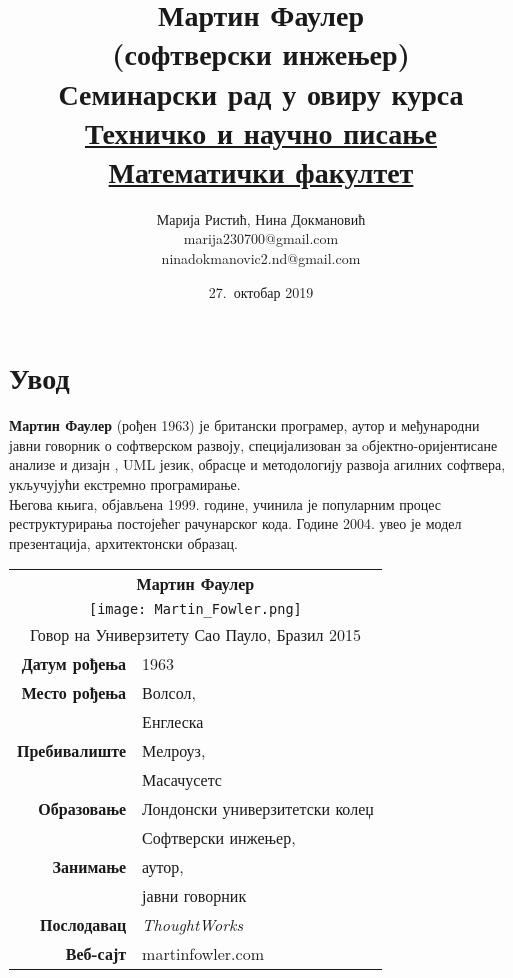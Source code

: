 \documentclass[12pt,a4paper]{article}
\begin{document}
\title{\textbf{Мартин Фаулер \\(софтверски инжењер)}\\ \small{Семинарски рад у овиру курса\\ \href{http://www.itkomunikacija.matf.bg.ac.rs/TehnickoINaucnoPisanje.html}{Техничко и научно писање}\\ \href{http://www.matf.bg.ac.rs/}{Математички факултет}}}
\author{Марија Ристић, Нина Докмановић\\marija230700@gmail.com\\ninadokmanovic2.nd@gmail.com}
\date{27.~октобар 2019}

\maketitle
\tableofcontents
\newpage

\section{{Увод}}
\label{sec:uvod}
\textbf{Мартин Фаулер} (рођен 1963) је британски програмер, аутор и међународни јавни говорник о софтверском развоју, специјализован за oбјектно-оријентисане анализе и дизајн , UML језик, обрасце и методологију развоја агилних софтвера, укључујући екстремно програмирање. \\Његова књига, објављена 1999. године, учинила је популарним процес реструктурирања постојећег рачунарског кода\cite{k_1}. Године 2004. увео је модел презентација, архитектонски образац.\cite{k_2}
\bigskip
\begin{center}
\begin{tabular}{|r|l|}\hline
	\multicolumn{2}{|c|}{\textbf{Мартин Фаулер}}\\
	\multicolumn{2}{|c|}{\texttt{[image: Martin\_Fowler.png]}} \\
	\multicolumn{2}{|c|}{Говор на Универзитету Сао Пауло, Бразил 2015} \\ \hline
	\textbf{Датум рођења} & 1963 \\ \cline{2-2}
	\textbf{Место рођења} & Волсол, \\
	&  Енглеска \\ \cline{2-2}
	\textbf{Пребивалиште} & Мелроуз, \\
	& Масачусетс \\ \cline{2-2}
	\textbf{Образовање} & Лондонски универзитетски колеџ \\ \cline{2-2}
	& Софтверски инжењер, \\
	\textbf{ Занимање} & аутор, \\
	& јавни говорник \\ \cline{2-2}
	\textbf{Послодавац} & \emph{ThoughtWorks} \\ \cline{2-2}
	\textbf{Веб-сајт}	& 	martinfowler.com \\ \hline
\end{tabular}
\end{center}
\newpage
\end{document}
